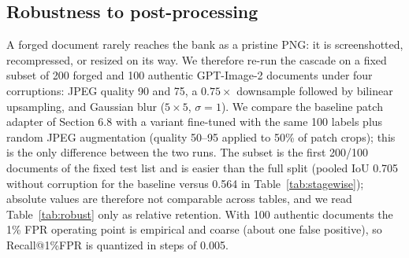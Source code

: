 \documentclass[preprint,12pt]{elsarticle}
\begin{document}
\subsection{Robustness to post-processing}\label{robustness-to-post-processing}

A forged document rarely reaches the bank as a pristine PNG: it is screenshotted, recompressed, or resized on its way. We therefore re-run the cascade on a fixed subset of 200 forged and 100 authentic GPT-Image-2 documents under four corruptions: JPEG quality 90 and 75, a $0.75\times$ downsample followed by bilinear upsampling, and Gaussian blur ($5\times5$, $\sigma{=}1$). We compare the baseline patch adapter of Section 6.8 with a variant fine-tuned with the same 100 labels plus random JPEG augmentation (quality 50--95 applied to 50\% of patch crops); this is the only difference between the two runs. The subset is the first 200/100 documents of the fixed test list and is easier than the full split (pooled IoU 0.705 without corruption for the baseline versus 0.564 in Table~\ref{tab:stagewise}); absolute values are therefore not comparable across tables, and we read Table~\ref{tab:robust} only as relative retention. With 100 authentic documents the 1\% FPR operating point is empirical and coarse (about one false positive), so Recall@1\%FPR is quantized in steps of 0.005.
\end{document}
